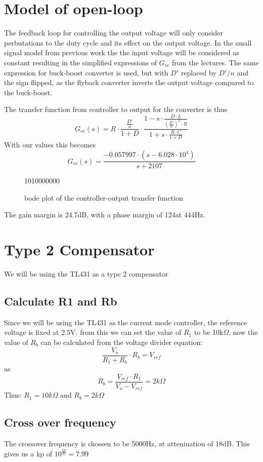 \section{Model of open-loop}
The feedback loop for controlling the output voltage will only consider perbutations to the duty cycle and its effect on the output voltage. In the small signal model from previous work the the input voltage will be considered as constant resulting in the simplified expressions of $G_{vc}$ from the lectures. The same expression for buck-boost converter is used, but with $D'$ replaced by $D'/n$ and the sign flipped, as the flyback converter inverts the output voltage compared to the buck-boost.

The transfer function from controller to output for the converter is thus
\[
G_{vc}(s) = R\cdot \frac{\frac{D'}{n}}{1+D}\cdot\frac{1-s\cdot \frac{D\cdot L}{(\frac{D'}{n})^2 \cdot R}}{1+s\cdot \frac{R\cdot C}{1+D}}
\]
With our values this becomes
\[
G_{vc}(s)=\frac{-0.057997\cdot (s - 6.028\cdot 10^4)}{s+2107}
\]
\begin{figure}[H]
    \centering
    {10}{10000000}
    \caption{bode plot of the controller-output transfer function}
    \label{fig:bp1}
\end{figure}

The gain margin is 24.7dB, with a phase margin of 124\degree at 444Hz.

\section{Type 2 Compensator}
We will be using the TL431 as a type 2 compensator
\subsection{Calculate R1 and Rb}
Since we will be using the TL431 as the current mode controller, the reference voltage is fixed at 2.5V. from this we can set the value of $R_1$ to be 10k$\Omega$, now the value of $R_b$ can be calculated from the voltage divider equation:
\[
\frac{V_o}{R_1 + R_b} \cdot R_b = V_{ref}
\]
as
\[
R_b = \frac{V_{ref}\cdot R_1}{V_o - V_{ref}} = 2k\Omega
\]
Thus: $R_1 = 10k\Omega$ and $R_b = 2k\Omega$

\subsection{Cross over frequency}
The crossover frequency is chossen to be 5000Hz, at atteniuation of 18dB. This gives us a kp of $10^{\frac{18}{20}}=7.99$
